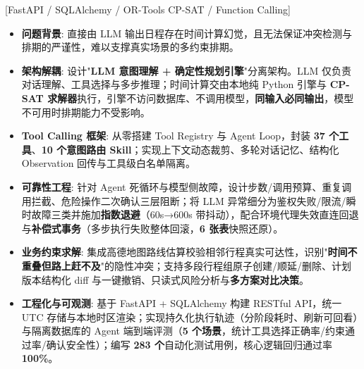%

[FastAPI / SQLAlchemy / OR-Tools CP-SAT / Function Calling]
\begin{itemize}
\item \textbf{问题背景}: 直接由 LLM 输出日程存在时间计算幻觉，且无法保证冲突检测与排期的严谨性，难以支撑真实场景的多约束排期。
\item \textbf{架构解耦}: 设计"\textbf{LLM 意图理解 + 确定性规划引擎}"分离架构。LLM 仅负责对话理解、工具选择与多步推理；时间计算交由本地纯 Python 引擎与 \textbf{CP-SAT 求解器}执行，引擎不访问数据库、不调用模型，\textbf{同输入必同输出}，模型不可用时排期能力不受影响。
\item \textbf{Tool Calling 框架}: 从零搭建 Tool Registry 与 Agent Loop，封装 \textbf{37 个工具}、\textbf{10 个意图路由 Skill}；实现上下文动态裁剪、多轮对话记忆、结构化 Observation 回传与工具级白名单隔离。
\item \textbf{可靠性工程}: 针对 Agent 死循环与模型侧故障，设计步数/调用预算、重复调用拦截、危险操作二次确认三层阻断；将 LLM 异常细分为鉴权失败/限流/瞬时故障三类并施加\textbf{指数退避}（60s→600s 带抖动），配合环境代理失效直连回退与\textbf{补偿式事务}（多步执行失败整体回滚，\textbf{6 张表}快照还原）。
\item \textbf{业务约束求解}: 集成高德地图路线估算校验相邻行程真实可达性，识别"\textbf{时间不重叠但路上赶不及}"的隐性冲突；支持多段行程组原子创建/顺延/删除、计划版本结构化 diff 与一键撤销、只读式风险分析与\textbf{多方案对比决策}。
\item \textbf{工程化与可观测}: 基于 FastAPI + SQLAlchemy 构建 RESTful API，统一 UTC 存储与本地时区渲染；实现持久化执行轨迹（分阶段耗时、刷新可回看）与隔离数据库的 Agent 端到端评测（\textbf{5 个场景}，统计工具选择正确率/约束通过率/确认安全性）；编写 \textbf{283 个}自动化测试用例，核心逻辑回归通过率 \textbf{100\%}。
\end{itemize}


